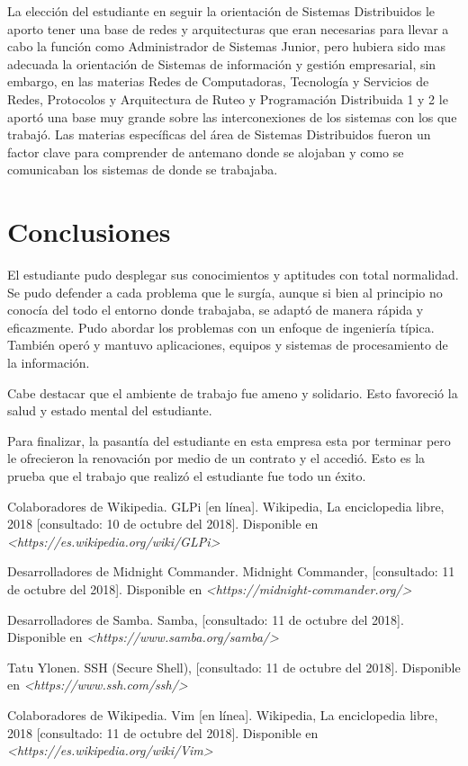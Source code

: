 \documentclass[12pt,a4paper]{article}
\begin{document}
La elección del estudiante en seguir la orientación de Sistemas Distribuidos le aporto tener una base de redes y arquitecturas que eran necesarias para llevar a cabo la función como Administrador de Sistemas Junior, pero hubiera sido mas adecuada la orientación de Sistemas de información y gestión empresarial, sin embargo, en las materias Redes de Computadoras, Tecnología y Servicios de Redes, Protocolos y Arquitectura de Ruteo y Programación Distribuida 1 y 2 le aportó una base muy grande sobre las interconexiones de los sistemas con los que trabajó. Las materias específicas del área de Sistemas Distribuidos fueron un factor clave para comprender de antemano donde se alojaban y como se comunicaban los sistemas de donde se trabajaba.

\section{Conclusiones}
El estudiante pudo desplegar sus conocimientos y aptitudes con total normalidad. Se pudo defender a cada problema que le surgía, aunque si bien al principio no conocía del todo el entorno donde trabajaba, se adaptó de manera rápida y eficazmente. Pudo abordar los problemas con un enfoque de ingeniería típica. También operó y mantuvo aplicaciones, equipos y sistemas de procesamiento de la información. 

Cabe destacar que el ambiente de trabajo fue ameno y solidario. Esto favoreció la salud y estado mental del estudiante. 

Para finalizar, la pasantía del estudiante en esta empresa esta por terminar pero le ofrecieron la renovación por medio de un contrato y el accedió. Esto es la prueba que el trabajo que realizó el estudiante fue todo un éxito.

\cleardoublepage
\begin{thebibliography}{9}
Colaboradores de Wikipedia. GLPi [en línea]. Wikipedia, La enciclopedia libre, 2018 [consultado: 10 de octubre del 2018]. Disponible en \textit{<https://es.wikipedia.org/wiki/GLPi>}

Desarrolladores de Midnight Commander. Midnight Commander, [consultado: 11 de octubre del 2018]. Disponible en \textit{<https://midnight-commander.org/>}  

Desarrolladores de Samba. Samba, [consultado: 11 de octubre del 2018]. Disponible en \textit{<https://www.samba.org/samba/>}  

Tatu Ylonen. SSH (Secure Shell), [consultado: 11 de octubre del 2018]. Disponible en \textit{<https://www.ssh.com/ssh/>}  

Colaboradores de Wikipedia. Vim [en línea]. Wikipedia, La enciclopedia libre, 2018 [consultado: 11 de octubre del 2018]. Disponible en \textit{<https://es.wikipedia.org/wiki/Vim>}



\end{thebibliography}
\end{document}
